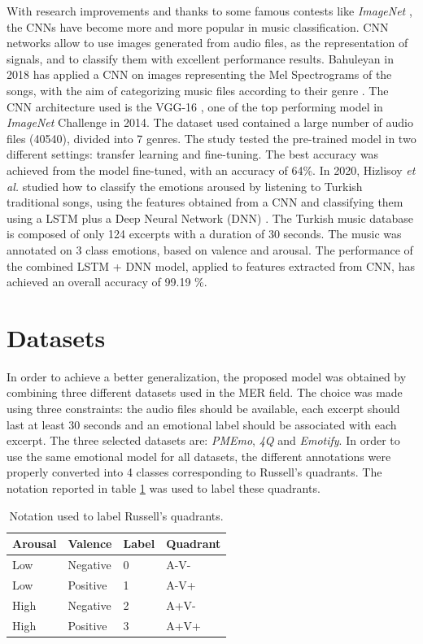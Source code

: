 \documentclass[runningheads]{llncs}
\begin{document}
With research improvements and thanks to some famous contests like \textit{ImageNet} \cite{krizhevsky2012imagenet}, the CNNs have become more and more popular in music classification. CNN networks allow to use images generated from audio files, as the representation of signals, and to classify them with excellent performance results. Bahuleyan in 2018 has applied a CNN on images representing the Mel Spectrograms of the songs, with the aim of categorizing music files according to their genre \cite{bahuleyan2018music}. The CNN architecture used is the VGG-16 \cite{simonyan2014very}, one of the top performing model in \textit{ImageNet} Challenge in 2014. The dataset used contained a large number of audio files (40540), divided into 7 genres. The study tested the pre-trained model in two different settings: transfer learning and fine-tuning. The best accuracy was achieved from the model fine-tuned, with an accuracy of 64\%.
In 2020, Hizlisoy \textit{et al.} studied how to classify the emotions aroused by listening to Turkish traditional songs, using the features obtained from a CNN and classifying them using a LSTM plus a Deep Neural Network (DNN) \cite{hizlisoy2021music}. The Turkish music database is composed of only 124 excerpts with a duration of 30 seconds. The music was annotated on 3 class emotions, based on valence and arousal. The performance of the combined LSTM + DNN model, applied to features extracted from CNN, has achieved an overall accuracy of 99.19 \%. 

\section{Datasets}
In order to achieve a better generalization, the proposed model  was obtained by combining three different datasets used in the MER field. The choice was made using three constraints: the audio files should be available, each excerpt should last at least 30 seconds and an emotional label should be associated with each excerpt. The three selected datasets are: \textit{PMEmo}\cite{zhang2018pmemo}, \textit{4Q}\cite{panda2018musical}\cite{panda2018novel} and \textit{Emotify}\cite{aljanaki2014collecting}\cite{aljanaki2016studying}.  In order to use the same emotional model for all datasets, the different annotations were properly converted into 4 classes corresponding to Russell's quadrants. The notation reported in table \ref{tab1} was used to label these quadrants. 
\begin{table}
\caption{Notation used to label Russell's quadrants.}
\label{tab1}
\centering
\begin{tabular}{|l|l|l|l|}
\hline
\textbf{Arousal} &  \textbf{Valence} & \textbf{Label} & \textbf{Quadrant}\\
\hline
Low &  Negative & 0 & A-V-\\
Low & Positive & 1 & A-V+\\
High & Negative & 2 & A+V-\\
High & Positive & 3 & A+V+\\
\hline
\end{tabular}
\end{table}
\end{document}
